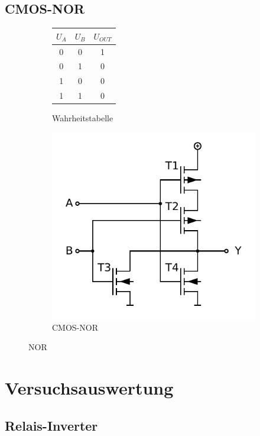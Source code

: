 \documentclass[a4paper]{article}
\begin{document}
\subsection{CMOS-NOR}
\begin{figure}[H]
    \centering
    \begin{subfigure}{.5\textwidth}
        \centering
        \begin{tabular}{c|c|c}
            $U_A$ & $U_B$ & $U_{OUT}$ \\ \hline
            0 & 0 & 1 \\
            0 & 1 & 0 \\
            1 & 0 & 0 \\
            1 & 1 & 0
        \end{tabular}
        \caption{Wahrheitstabelle}
        \label{tab:nor}
    \end{subfigure}%
    \begin{subfigure}{.5\textwidth}
        \centering
        \includegraphics[width=.8\linewidth]{Vorbereitung/Cmos_nor.pdf}
        \caption{CMOS-NOR}
        \label{fig:nor-cmos}
    \end{subfigure}
    \caption{NOR}
    \label{fig:nor}
\end{figure}

\newpage

\section{Versuchsauswertung}
\subsection{Relais-Inverter}
\end{document}
